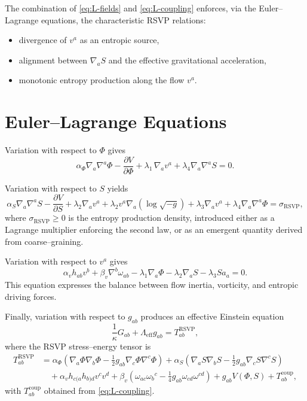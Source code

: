 The combination of \eqref{eq:L-fields} and \eqref{eq:L-coupling} enforces, via the Euler–Lagrange equations, the characteristic RSVP relations:
\begin{itemize}
  \item divergence of $v^a$ as an entropic source,
  \item alignment between $\nabla_a S$ and the effective gravitational acceleration,
  \item monotonic entropy production along the flow $v^a$.
\end{itemize}

\section{Euler–Lagrange Equations}

Variation with respect to $\Phi$ gives
\begin{equation}
\label{eq:EOM-Phi}
\alpha_\Phi \nabla_a\nabla^a\Phi
  - \frac{\partial V}{\partial \Phi}
  + \lambda_1\,\nabla_a v^a
  + \lambda_4 \nabla_a\nabla^a S
  = 0.
\end{equation}

Variation with respect to $S$ yields
\begin{equation}
\label{eq:EOM-S}
\alpha_S \nabla_a\nabla^a S
  - \frac{\partial V}{\partial S}
  + \lambda_2 \nabla_a v^a
  + \lambda_2 v^a\nabla_a (\log\sqrt{-g})
  + \lambda_3 \nabla_a v^a
  + \lambda_4 \nabla_a\nabla^a \Phi
  = \sigma_{\mathrm{RSVP}},
\end{equation}
where $\sigma_{\mathrm{RSVP}}\ge 0$ is the entropy production density, introduced either as a Lagrange multiplier enforcing the second law, or as an emergent quantity derived from coarse–graining.

Variation with respect to $v^a$ gives
\begin{equation}
\label{eq:EOM-v}
\alpha_v h_{ab} v^b
  + \beta_v \nabla^b\omega_{ab}
  - \lambda_1\nabla_a\Phi
  - \lambda_2 \nabla_a S
  - \lambda_3 S a_a
  = 0.
\end{equation}
This equation expresses the balance between flow inertia, vorticity, and entropic driving forces.

Finally, variation with respect to $g_{ab}$ produces an effective Einstein equation
\begin{equation}
\label{eq:EOM-g}
\frac{1}{\kappa} G_{ab}
  + \Lambda_{\mathrm{eff}} g_{ab}
  = T^{\mathrm{RSVP}}_{ab},
\end{equation}
where the RSVP stress–energy tensor is
\begin{equation}
\begin{aligned}
T^{\mathrm{RSVP}}_{ab}
  &= \alpha_\Phi\left(\nabla_a\Phi\nabla_b\Phi
      - \tfrac{1}{2} g_{ab}\nabla_c\Phi\nabla^c\Phi\right)
   + \alpha_S\left(\nabla_a S\nabla_b S
      - \tfrac{1}{2} g_{ab}\nabla_c S\nabla^c S\right) \\
  &\quad
   + \alpha_v h_{c(a} h_{b)d} v^c v^d
   + \beta_v\left(\omega_{ac}\omega_b{}^c
      -\tfrac{1}{4} g_{ab} \omega_{cd}\omega^{cd}\right)
   + g_{ab} V(\Phi,S)
   + T^{\mathrm{coup}}_{ab},
\end{aligned}
\end{equation}
with $T^{\mathrm{coup}}_{ab}$ obtained from \eqref{eq:L-coupling}.  

